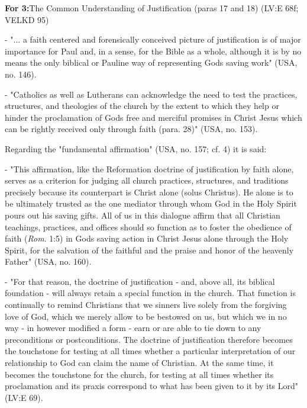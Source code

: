 \textbf{For 3:}The Common Understanding of Justification (paras 17 and
18) (LV:E 68f; VELKD 95)

- "... a faith centered and forensically conceived picture of
justification is of major importance for Paul and, in a sense, for the
Bible as a whole, although it is by no means the only biblical or
Pauline way of representing God\textquotesingle s saving work" (USA, no.
146).

- "Catholics as well as Lutherans can acknowledge the need to test the
practices, structures, and theologies of the church by the extent to
which they help or hinder \textquotesingle the proclamation of
God\textquotesingle s free and merciful promises in Christ Jesus which
can be rightly received only through faith\textquotesingle{} (para. 28)"
(USA, no. 153).

Regarding the "fundamental affirmation" (USA, no. 157; cf. 4) it is
said:

- "This affirmation, like the Reformation doctrine of justification by
faith alone, serves as a criterion for judging all church practices,
structures, and traditions precisely because its counterpart is
\textquotesingle Christ alone\textquotesingle{} (solus Christus). He
alone is to be ultimately trusted as the one mediator through whom God
in the Holy Spirit pours out his saving gifts. All of us in this
dialogue affirm that all Christian teachings, practices, and offices
should so function as to foster \textquotesingle the obedience of
faith\textquotesingle{} (\emph{Rom}. 1:5) in God\textquotesingle s
saving action in Christ Jesus alone through the Holy Spirit, for the
salvation of the faithful and the praise and honor of the heavenly
Father" (USA, no. 160).

- "For that reason, the doctrine of justification - and, above all, its
biblical foundation - will always retain a special function in the
church. That function is continually to remind Christians that we
sinners live solely from the forgiving love of God, which we merely
allow to be bestowed on us, but which we in no way - in however modified
a form - \textquotesingle earn\textquotesingle{} or are able to tie down
to any preconditions or postconditions. The doctrine of justification
therefore becomes the touchstone for testing at all times whether a
particular interpretation of our relationship to God can claim the name
of \textquotesingle Christian.\textquotesingle{} At the same time, it
becomes the touchstone for the church, for testing at all times whether
its proclamation and its praxis correspond to what has been given to it
by its Lord" (LV:E 69).

